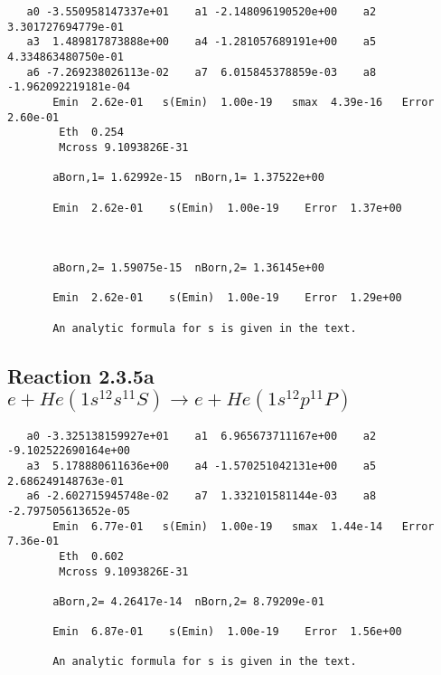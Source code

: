 \documentclass[12pt,dvipdfm]{article}
\begin{document}
\begin{small}\begin{verbatim}
   a0 -3.550958147337e+01    a1 -2.148096190520e+00    a2  3.301727694779e-01
   a3  1.489817873888e+00    a4 -1.281057689191e+00    a5  4.334863480750e-01
   a6 -7.269238026113e-02    a7  6.015845378859e-03    a8 -1.962092219181e-04
       Emin  2.62e-01   s(Emin)  1.00e-19   smax  4.39e-16   Error  2.60e-01
        Eth  0.254
        Mcross 9.1093826E-31

       aBorn,1= 1.62992e-15  nBorn,1= 1.37522e+00

       Emin  2.62e-01    s(Emin)  1.00e-19    Error  1.37e+00



       aBorn,2= 1.59075e-15  nBorn,2= 1.36145e+00

       Emin  2.62e-01    s(Emin)  1.00e-19    Error  1.29e+00

       An analytic formula for s is given in the text.
\end{verbatim}\end{small}







\newpage
\subsection{
Reaction 2.3.5a $   e + He(1s^12s^11S) \rightarrow e + He(1s^12p^11P)$}





\begin{small}\begin{verbatim}
   a0 -3.325138159927e+01    a1  6.965673711167e+00    a2 -9.102522690164e+00
   a3  5.178880611636e+00    a4 -1.570251042131e+00    a5  2.686249148763e-01
   a6 -2.602715945748e-02    a7  1.332101581144e-03    a8 -2.797505613652e-05
       Emin  6.77e-01   s(Emin)  1.00e-19   smax  1.44e-14   Error  7.36e-01
        Eth  0.602
        Mcross 9.1093826E-31

       aBorn,2= 4.26417e-14  nBorn,2= 8.79209e-01

       Emin  6.87e-01    s(Emin)  1.00e-19    Error  1.56e+00

       An analytic formula for s is given in the text.
\end{verbatim}\end{small}




\newpage
\end{document}

